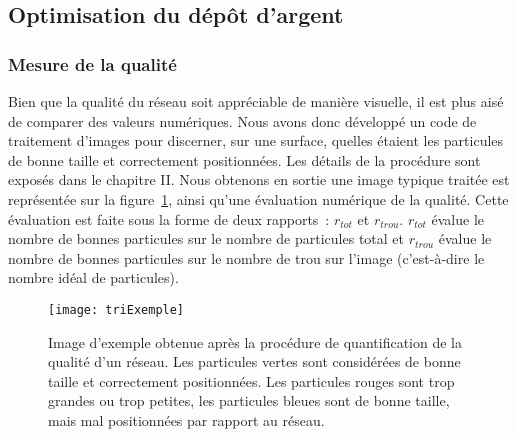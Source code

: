 	\subsection{Optimisation du dépôt d'argent}
	\label{sQuality}
	\subsubsection{Mesure de la qualité}
Bien que la qualité du réseau soit appréciable de manière visuelle, il est plus aisé de comparer des valeurs numériques. Nous avons donc développé un code de traitement d'images pour discerner, sur une surface, quelles étaient les particules de bonne taille et correctement positionnées. Les détails de la procédure sont exposés dans le chapitre II. Nous obtenons en sortie une image typique traitée est représentée sur la figure~\ref{triExempleChpter3}, ainsi qu'une évaluation numérique de la qualité. Cette évaluation est faite sous la forme de deux rapports~: $r_{tot}$ et $r_{trou}$. $r_{tot}$ évalue le nombre de bonnes particules sur le nombre de particules total et $r_{trou}$ évalue le nombre de bonnes particules sur le nombre de trou sur l'image (c'est-à-dire le nombre idéal de particules). \par 
\begin{figure}[!htb]
\centering
\texttt{[image: triExemple]}
\caption{Image d'exemple obtenue après la procédure de quantification de la qualité d'un réseau. Les particules vertes sont considérées de bonne taille et correctement positionnées. Les particules rouges sont trop grandes ou trop petites, les particules bleues sont de bonne taille, mais mal positionnées par rapport au réseau.}
\label{triExempleChpter3}
\end{figure}
